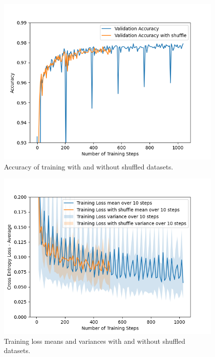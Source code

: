 \documentclass{article}
\begin{document}
\begin{figure}[H]
    \centering
    \includegraphics[width = \textwidth]{Assignment_1/Assignments/plots/task2de/task2e_train_accuracy_shuffle_difference.png}
    \caption{Accuracy of training with and without shuffled datasets.}
    
    \label{fig:2eshuffle}
\end{figure}
\begin{figure}[H]
    \centering
    \includegraphics[width = \textwidth]{
Assignment_1/Assignments/plots/task2de/task2e_train_loss_with_shuffle.png}
    \caption{Training loss means and variances with and without shuffled datasets. }
    \label{fig:2eshuffleloss}
\end{figure}
\end{document}
